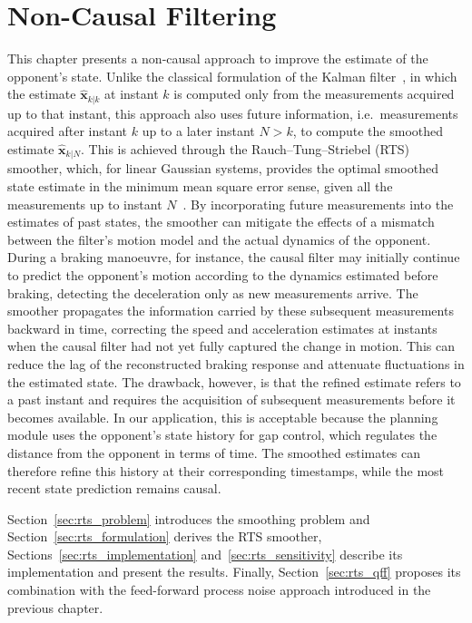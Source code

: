 \chapter{Non-Causal Filtering}
\label{ch:rts}

This chapter presents a non-causal approach to improve the estimate of the opponent's state.
Unlike the classical formulation of the Kalman filter~\cite{kalman1960}, in which the
estimate $\hat{\mathbf{x}}_{k|k}$ at instant $k$ is computed only from the measurements
acquired up to that instant, this approach also uses future information, i.e.\ measurements
acquired after instant $k$ up to a later instant $N > k$, to compute the smoothed estimate
$\hat{\mathbf{x}}_{k|N}$. This is achieved through the Rauch--Tung--Striebel (RTS) smoother,
which, for linear Gaussian systems, provides the optimal smoothed state estimate in the
minimum mean square error sense, given all the measurements up to instant
$N$~\cite{rauch1965,sarkka2013book}. By incorporating future measurements into the estimates
of past states, the smoother can mitigate the effects of a mismatch between the filter's
motion model and the actual dynamics of the opponent. During a braking manoeuvre, for
instance, the causal filter may initially continue to predict the opponent's motion
according to the dynamics estimated before braking, detecting the deceleration only as new
measurements arrive. The smoother propagates the information carried by these subsequent
measurements backward in time, correcting the speed and acceleration estimates at instants
when the causal filter had not yet fully captured the change in motion. This can reduce the
lag of the reconstructed braking response and attenuate fluctuations in the estimated state.
The drawback, however, is that the refined estimate refers to a past instant and requires
the acquisition of subsequent measurements before it becomes available. In our application,
this is acceptable because the planning module uses the opponent's state history for gap
control, which regulates the distance from the opponent in terms of time. The smoothed
estimates can therefore refine this history at their corresponding timestamps, while the
most recent state prediction remains causal.

Section~\ref{sec:rts_problem} introduces the smoothing problem and
Section~\ref{sec:rts_formulation} derives the RTS smoother, 
Sections~\ref{sec:rts_implementation} and~\ref{sec:rts_sensitivity} describe its
implementation and present the results. Finally, Section~\ref{sec:rts_qff} proposes its
combination with the feed-forward process noise approach introduced in the previous chapter.

